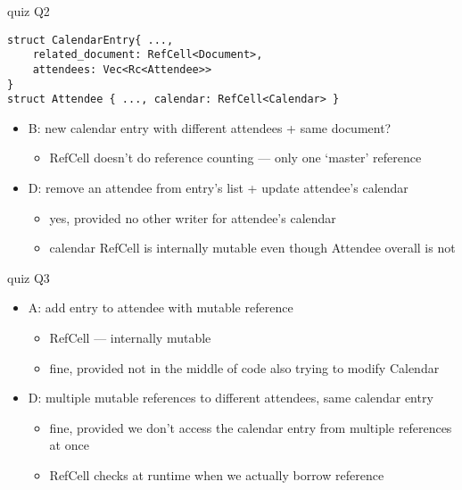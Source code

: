 \begin{frame}[fragile]{quiz Q2}
\begin{Verbatim}[fontsize=\small]
struct CalendarEntry{ ...,
    related_document: RefCell<Document>,
    attendees: Vec<Rc<Attendee>>
}
struct Attendee { ..., calendar: RefCell<Calendar> }
\end{Verbatim}
    \begin{itemize}
    \item B: new calendar entry with different attendees + same document?
        \begin{itemize}
        \item RefCell doesn't do reference counting --- only one `master' reference
        \end{itemize}
    \item D: remove an attendee from entry's list + update attendee's calendar
        \begin{itemize}
        \item yes, provided no other writer for attendee's calendar
        \item calendar RefCell is internally mutable even though Attendee overall is not
        \end{itemize}
    \end{itemize}
\end{frame}

\begin{frame}{quiz Q3}
\begin{itemize}
    \item A: add entry to attendee with mutable reference
        \begin{itemize}
        \item RefCell --- internally mutable
        \item fine, provided not in the middle of code also trying to modify Calendar
        \end{itemize}
    \item D: multiple mutable references to different attendees, same calendar entry
        \begin{itemize}
        \item fine, provided we don't access the calendar entry from multiple references at once
        \item RefCell checks at runtime when we actually borrow reference
        \end{itemize}
\end{itemize}
\end{frame}


